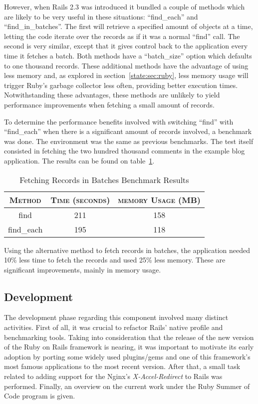 However, when Rails 2.3 was introduced it bundled a couple of methods which are likely to be very useful in these situations: ``find\_each'' and ``find\_in\_batches''. The first will retrieve a specified amount of objects at a time, letting the code iterate over the records as if it was a normal ``find'' call. The second is very similar, except that it gives control back to the application every time it fetches a batch. Both methods have a ``batch\_size'' option which defaults to one thousand records. These additional methods have the advantage of using less memory and, as explored in section~\ref{state:sec:ruby}, less memory usage will trigger Ruby's garbage collector less often, providing better execution times. Notwithstanding these advantages, these methods are unlikely to yield performance improvements when fetching a small amount of records.

To determine the performance benefits involved with switching ``find'' with ``find\_each'' when there is a significant amount of records involved, a benchmark was done. The environment was the same as previous benchmarks. The test itself consisted in fetching the two hundred thousand comments in the example blog application. The results can be found on table~\ref{tab:fetch_in_batches}.
\begin{table}[h!t]
  \centering
  \caption{Fetching Records in Batches Benchmark Results}
  \label{tab:fetch_in_batches}
  
  \begin{tabular}{c|c|c}
  
    \textbf{\textsc{Method}} & \textbf{\textsc{Time (seconds)}} & \textbf{\textsc{memory Usage (MB)}} \\ \hline
    find & 211 & 158 \\ \hline
    find\_each & 195 & 118 \\
  \end{tabular}
\end{table}

Using the alternative method to fetch records in batches, the application needed 10\% less time to fetch the records and used 25\% less memory. These are significant improvements, mainly in memory usage.

\subsection{Development}
The development phase regarding this component involved many distinct activities. First of all, it was crucial to refactor Rails' native profile and benchmarking tools. Taking into consideration that the release of the new version of the Ruby on Rails framework is nearing, it was important to motivate its early adoption by porting some widely used plugins/gems and one of this framework's most famous applications to the most recent version. After that, a small task related to adding support for the Nginx's \textit{X-Accel-Redirect} to Rails was performed. Finally, an overview on the current work under the Ruby Summer of Code program is given.


